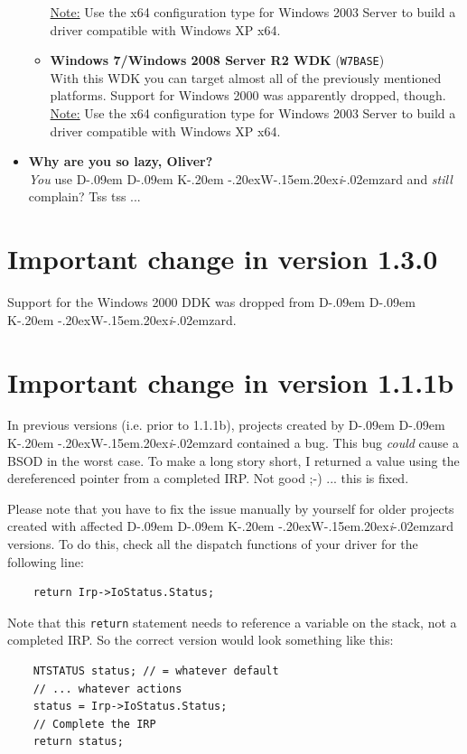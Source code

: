 \documentclass[a4paper,titlepage]{report}
\def\ddkwiz{\texorpdfstring{D\kern-.09em D\kern-.09em K\kern-.20em \raise-.20ex\hbox{W}\kern-.15em\raise.20ex\hbox{\it{i}}\kern-.02em{zard}}{DDKWizard}}
\begin{document}
\begin{itemize}
\begin{itemize}
            \underline{Note:} Use the x64 configuration type for Windows 2003 Server to
            build a driver compatible with Windows XP x64.
          \item
            \textbf{Windows 7/Windows 2008 Server R2 WDK} (\texttt{W7BASE})\\
            With this WDK
            you can target almost all of the previously mentioned platforms. Support for
            Windows 2000 was apparently dropped, though.\\
            \underline{Note:} Use the x64 configuration type for Windows 2003 Server to
            build a driver compatible with Windows XP x64.


        \end{itemize}
  \item \textbf{Why are you so lazy, Oliver?}\\
        \emph{You} use \ddkwiz{} and \emph{still} complain? Tss tss ...
\end{itemize}

\section{Important change in version 1.3.0}
Support for the Windows 2000 DDK was dropped from \ddkwiz{}.

\section{Important change in version 1.1.1b}
In previous versions (i.e. prior to 1.1.1b), projects created by \ddkwiz{} contained
a bug. This bug \emph{could} cause a BSOD in the worst case. To make a long story short,
I returned a value using the dereferenced pointer from a completed IRP. Not good \textsf{;-)}
... this is fixed.

Please note that you have to fix the issue manually by yourself for older projects created
with affected \ddkwiz{} versions. To do this, check all the dispatch functions of your driver
for the following line:

\begin{verbatim}
    return Irp->IoStatus.Status;
\end{verbatim}

Note that this \texttt{return} statement needs to reference a variable on the stack, not a completed
IRP. So the correct version would look something like this:

\begin{verbatim}
    NTSTATUS status; // = whatever default
    // ... whatever actions
    status = Irp->IoStatus.Status;
    // Complete the IRP
    return status;
\end{verbatim}
\end{document}
